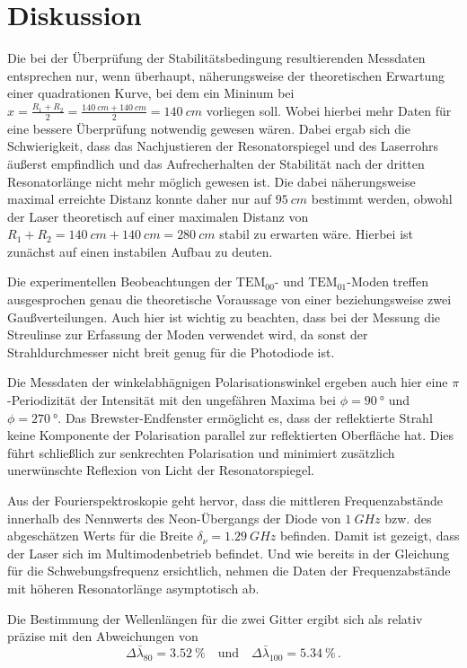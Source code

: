 \section{Diskussion}
\label{sec:Diskussion}

Die bei der Überprüfung der Stabilitätsbedingung resultierenden Messdaten entsprechen nur, wenn überhaupt,
näherungsweise der theoretischen Erwartung
einer quadrationen Kurve, bei dem ein Mininum bei 
$ x = \frac{R_1 + R_2}{2} = \frac{\qty{140}{cm} + \qty{140}{cm}}{2} = \qty{140}{cm}$ vorliegen soll.
Wobei hierbei mehr Daten für eine bessere Überprüfung notwendig gewesen wären.
Dabei ergab sich die Schwierigkeit, 
dass das Nachjustieren der Resonatorspiegel und des Laserrohrs äußerst empfindlich
und das Aufrecherhalten der Stabilität nach der dritten Resonatorlänge nicht mehr möglich gewesen ist.
Die dabei näherungsweise maximal erreichte Distanz konnte daher nur auf $\qty{95}{cm}$ bestimmt werden, 
obwohl der Laser theoretisch auf einer maximalen Distanz von $R_1 + R_2 =  \qty{140}{cm} + \qty{140}{cm} = \qty{280}{cm}$ stabil zu erwarten wäre. 
Hierbei ist zunächst auf einen instabilen Aufbau zu deuten. 

Die experimentellen Beobeachtungen der $\text{TEM}_{00}$- und $\text{TEM}_{01}$-Moden treffen ausgesprochen genau die
theoretische Voraussage von einer beziehungsweise zwei Gaußverteilungen. 
Auch hier ist wichtig zu beachten, dass bei der Messung die Streulinse zur Erfassung der Moden verwendet wird,
da sonst der Strahldurchmesser nicht breit genug für die Photodiode ist.

Die Messdaten der winkelabhägnigen Polarisationswinkel ergeben auch hier eine $\pi$-Periodizität der Intensität
mit den ungefähren Maxima bei $\phi = \qty{90}{\degree}$ und $\phi = \qty{270}{\degree}$.
Das Brewster-Endfenster ermöglicht es, dass der reflektierte Strahl keine Komponente der Polarisation parallel zur reflektierten Oberfläche hat.
Dies führt schließlich zur senkrechten Polarisation und minimiert zusätzlich unerwünschte Reflexion von Licht der Resonatorspiegel.

Aus der Fourierspektroskopie geht hervor, 
dass die mittleren Frequenzabstände innerhalb des Nennwerts des Neon-Übergangs der Diode von $\qty{1}{GHz}$ bzw.
des abgeschätzen Werts für die Breite $\delta_\nu = \qty{1,29}{GHz}$ befinden.
Damit ist gezeigt, dass der Laser sich im Multimodenbetrieb befindet.
Und wie bereits in der Gleichung für die Schwebungsfrequenz ersichtlich, 
nehmen die Daten der Frequenzabstände mit höheren Resonatorlänge asymptotisch ab.

Die Bestimmung der Wellenlängen für die zwei Gitter ergibt sich als relativ präzise mit den Abweichungen von
\begin{equation*}
    \Delta \bar{\lambda}_{80} = \qty{3.52}{\percent} \quad \text{und} \quad 
    \Delta \bar{\lambda}_{100} = \qty{5.34}{\percent} \, .
\end{equation*}